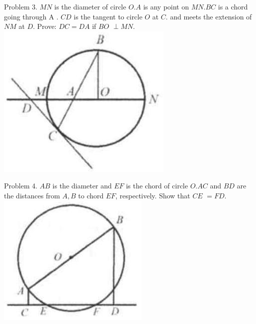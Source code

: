 \documentclass[10pt]{article}
\begin{document}
Problem 3. \(M N\) is the diameter of circle \(O . A\) is any point on \(M N . B C\) is a chord going through A . \(C D\) is the tangent to circle \(O\) at \(C\). and meets the extension of \(N M\) at \(D\). Prove: \(D C=D A\) if \(B O\) \(\perp M N\).\\
\includegraphics[max width=\textwidth, center]{2025_04_17_97bc1f7e44d93c271a88g-154(3)}

Problem 4. \(A B\) is the diameter and \(E F\) is the chord of circle \(O . A C\) and \(B D\) are the distances from \(A, B\) to chord \(E F\), respectively. Show that \(C E\) \(=F D\).\\
\includegraphics[max width=\textwidth, center]{2025_04_17_97bc1f7e44d93c271a88g-154}
\end{document}
